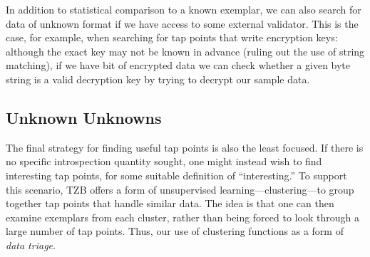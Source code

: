 In addition to statistical comparison to a known exemplar, we can also
search for data of unknown format if we have access to some external
validator. This is the case, for example, when searching for tap points
that write encryption keys: although the exact key may not be known in
advance (ruling out the use of string matching), if we have bit of
encrypted data we can check whether a given byte string is a valid
decryption key by trying to decrypt our sample data.

\subsection{Unknown Unknowns}

The final strategy for finding useful tap points is also the least
focused. If there is no specific introspection quantity sought, one
might instead wish to find interesting tap points, for some suitable
definition of ``interesting.'' To support this scenario, TZB offers a
form of unsupervised learning---clustering---to group together tap
points that handle similar data. The idea is that one can then examine
exemplars from each cluster, rather than being forced to look through a
large number of tap points. Thus, our use of clustering functions as a
form of \emph{data triage}.
